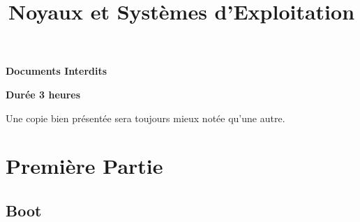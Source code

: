 %
%
%
%
%
%

%
%

%
%

\def\path{../../..}

%
%



%
%

\title{Noyaux et Syst\`emes d'Exploitation}

%
%

\rhead{}

%
%



%
%

\maketitle

%
%

\indentation{}

%
%

\begin{center}

\textbf{Documents Interdits}

\textbf{Dur\'ee 3 heures}

\scriptsize{Une copie bien pr\'esent\'ee sera toujours mieux not\'ee
            qu'une autre.}

\end{center}

%
%

%
%

\section{Premi\`ere Partie
         {\hfill{} }}

\subsection{Boot
            {\hfill{} }}


